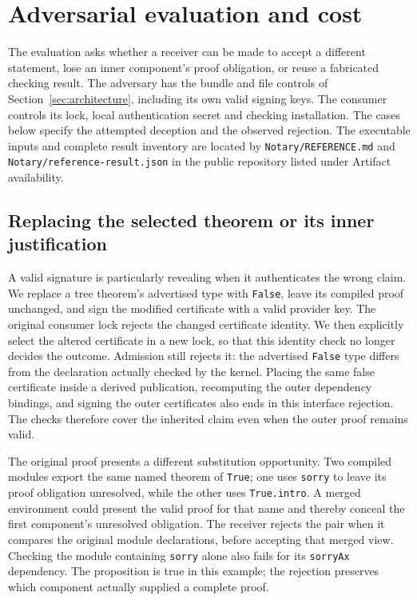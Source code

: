 \documentclass[11pt]{article}
\begin{document}
\section{Adversarial evaluation and cost}

The evaluation asks whether a receiver can be made to accept a different
statement, lose an inner component's proof obligation, or reuse a fabricated
checking result. The adversary has the bundle and file controls of
Section~\ref{sec:architecture}, including its own valid signing keys. The
consumer controls its lock, local authentication secret and checking installation.
The cases below specify the attempted deception and the observed rejection.
The executable inputs and complete result inventory are located by
\texttt{Notary/REFERENCE.md} and \texttt{Notary/reference-result.json} in the
public repository listed under Artifact availability.

\subsection{Replacing the selected theorem or its inner justification}

A valid signature is particularly revealing when it authenticates the wrong
claim. We replace a tree theorem's advertised type with \texttt{False}, leave
its compiled proof unchanged, and sign the modified certificate with a valid
provider key. The original consumer lock rejects the changed certificate
identity. We then explicitly select the altered certificate in a new lock,
so that this identity check no longer decides the outcome. Admission still
rejects it: the advertised \texttt{False} type differs from the declaration
actually checked by the kernel. Placing the same false certificate inside a
derived publication, recomputing the outer dependency bindings, and signing
the outer certificates also ends in this interface rejection. The checks
therefore cover the inherited claim even when the outer proof remains valid.

The original proof presents a different substitution opportunity. Two compiled
modules export the same named theorem of \texttt{True}; one uses
\texttt{sorry} to leave its proof obligation unresolved, while the other uses
\texttt{True.intro}. A merged
environment could present the valid proof for that name and thereby conceal
the first component's unresolved obligation. The receiver rejects the pair
when it compares the original module declarations, before accepting that
merged view. Checking the module containing \texttt{sorry} alone also fails for its
\texttt{sorryAx} dependency. The proposition is true in this example; the
rejection preserves which component actually supplied a complete proof.
\end{document}
